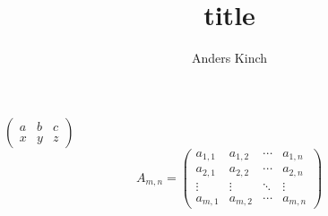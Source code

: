 \documentclass[12pt, twoside,a4paper]{article}
\title{title}
\author{Anders Kinch}
\date {}
\newcommand\m[1]{\begin{pmatrix}#1\end{pmatrix}}
\begin{document}
\maketitle

$ \m{a&b&c\\x&y&z} $
\begin{equation*}
A_{m,n} = 
\begin{pmatrix}
a_{1,1} & a_{1,2} & \cdots & a_{1,n} \\
a_{2,1} & a_{2,2} & \cdots & a_{2,n} \\
\vdots  & \vdots  & \ddots & \vdots  \\
a_{m,1} & a_{m,2} & \cdots & a_{m,n} 
\end{pmatrix}
\end{equation*}


\medskip

\nocite{*}

%

\end{document}
